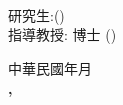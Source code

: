 \begin{center}
	\fontsize{18}{27pt}\selectfont
		\universityCh\\
		\instituteCh\\
		\masterThesisCh\\[1cm]

	\fontsize{14}{21pt}\selectfont
		\instituteEn\\
	
	\fontsize{16}{24pt}\selectfont
		\universityEn\\
		\masterThesisEn\\[1cm]
	
	\fontsize{18}{27pt}\selectfont
		\titleCh\\
		\titleEn\\[2cm]

	\fontsize{18}{27pt}\selectfont
			研究生:\studentCh (\studentEn)\\
    			指導教授:\advisorCh \hspace{0.08cm} 博士 (\advisorEn)\\
\end{center}

\vspace{\fill}
\vspace{3cm}

\begin{center}
	{\Large 中華民國 年 月}\\
	\LARGE \textbf{, }
\end{center}
